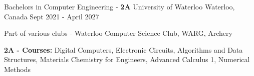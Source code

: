 

\begin{cventries}

  \cventry
    {Bachelors in Computer Engineering - \textbf{2A}} %
    {University of Waterloo} %
    {Waterloo, Canada} %
    {Sept 2021 - April 2027} %
    {
      \begin{cvitems} %
        \item {Part of various clubs - Waterloo Computer Science Club, WARG, Archery}
        \item {\textbf{2A - Courses:} Digital Computers, Electronic Circuits, Algorithms and Data Structures, Materials Chemistry for Engineers, Advanced Calculus 1, Numerical Methods}
      \end{cvitems}
    }
    
\end{cventries}
